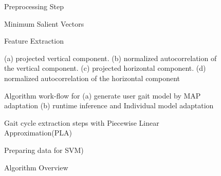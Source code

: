 \documentclass{sig-alternate}
\begin{document}
\begin{figure}
\centering
{}
\caption{Preprocessing Step}
\label{fig:firstStep}
\end{figure}

\begin{figure*}
\centering
{}
\caption{Minimum Salient Vectors}
\label{fig:AccelChart}
\end{figure*}

\begin{figure}
\centering
{}
\caption{Feature Extraction}
\label{fig:SecondStep}
\end{figure}

\begin{figure}
\centering
{}
\caption{(a) projected vertical component. (b) normalized autocorrelation of the vertical component. (c) projected horizontal component. (d) normalized autocorrelation of the horizontal component}
\label{fig:TD1}
\end{figure}

\begin{figure}
\centering
{}
\caption{Algorithm work-flow for (a) generate user gait model by MAP adaptation (b) runtime inference and Individual model adaptation}
\label{fig:TD2}
\end{figure}

\begin{figure}
\centering
{}
\caption{Gait cycle extraction steps with Piecewise Linear Approximation(PLA)}
\label{fig:AddedStep}
\end{figure}

\begin{figure}
\centering
{}
\caption{Preparing data for SVM)}
\label{fig:TrainingData}
\end{figure}

\begin{figure}
\centering
{}
\caption{Algorithm Overview}
\label{fig:Paper1Summary}
\end{figure}
\end{document}
